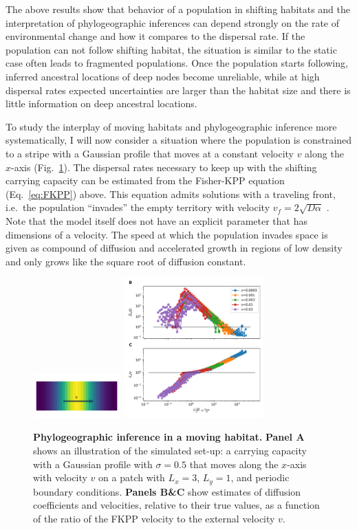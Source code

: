 \documentclass[aps,rmp, twocolumn]{revtex4}
\newcommand{\vfkpp}{v_f}
\begin{document}
The above results show that behavior of a population in shifting habitats and the interpretation of phylogeographic inferences can depend strongly on the rate of environmental change and how it compares to the dispersal rate.
If the population can not follow shifting habitat, the situation is similar to the static case often leads to fragmented populations.
Once the population starts following, inferred ancestral locations of deep nodes become unreliable, while at high dispersal rates expected uncertainties are larger than the habitat size and there is little information on deep ancestral locations.

To study the interplay of moving habitats and phylogeographic inference more systematically, I will now consider a situation where the population is constrained to a stripe with a Gaussian profile that moves at a constant velocity $v$ along the $x$-axis (Fig.~\ref{fig:traveling_wave}).
The dispersal rates necessary to keep up with the shifting carrying capacity can be estimated from the Fisher-KPP equation (Eq.~\ref{eq:FKPP}) above.
This equation admits solutions with a traveling front, i.e.~the population ``invades'' the empty territory with velocity $\vfkpp = 2\sqrt{D \alpha}$ \citep{fisher_wave_1937,KPP1937,hallatschek_life_2010}.
Note that the model itself does not have an explicit parameter that has dimensions of a velocity.
The speed at which the population invades space is given as compound of diffusion and accelerated growth in regions of low density and only grows like the square root of diffusion constant.


\begin{figure}
    \includegraphics[width=0.3\textwidth]{figures/traveling_wave}
    \includegraphics[width=0.48\textwidth]{figures/waves}
    \caption{\label{fig:traveling_wave}{\bf Phylogeographic inference in a moving habitat.}
    {\bf Panel A} shows an illustration of the simulated set-up: a carrying capacity with a Gaussian profile with $\sigma=0.5$ that moves along the $x$-axis with velocity $v$ on a patch with $L_x=3$, $L_y=1$, and periodic boundary conditions.
    {\bf Panels B\&C} show estimates of diffusion coefficients and velocities, relative to their true values, as a function of the ratio of the FKPP velocity to the external velocity $v$. }
\end{figure}
\end{document}
